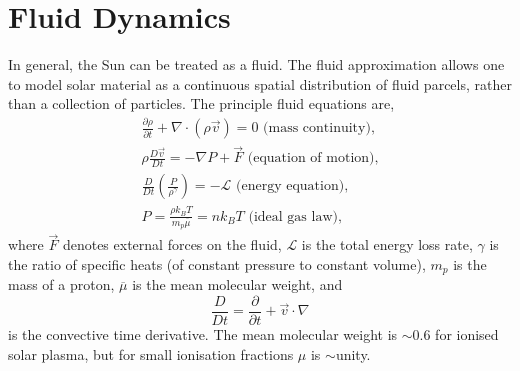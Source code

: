 \section{Fluid Dynamics}

In general, the Sun can be treated as a fluid. The fluid approximation allows one to model solar material as a continuous spatial distribution of fluid parcels, rather than a collection of particles. The principle fluid equations are,
\begin{eqnarray}
\label{eqn:mhdmasscont} \frac{\partial \rho}{\partial t}+\nabla\cdot(\rho \vec{v}) = 0 \mbox{ (mass continuity),} \\
\label{eqn:fluidmotion} \rho \frac{D \vec{v}}{D t} = -\nabla P + \vec{F} \mbox{ (equation of motion),} \\
\label{eqn:fluidenergy} \frac{D}{D t}\left( \frac{P}{\rho^{\gamma}} \right) = -\mathcal{L} \mbox{ (energy equation),} \\
P=\frac{\rho k_B T}{m_p \overline{\mu}} = n k_B T \mbox{ (ideal gas law),}
\end{eqnarray}
where $\vec{F}$ denotes external forces on the fluid, $\mathcal{L}$ is the total energy loss rate, $\gamma$ is the ratio of specific heats (of constant pressure to constant volume), $m_p$ is the mass of a proton, $\overline{\mu}$ is the mean molecular weight, and
\begin{equation}
\frac{D}{D t} = \frac{\partial}{\partial t}+\vec{v} \cdot \nabla
\end{equation}
is the convective time derivative. The mean molecular weight is $\sim$0.6 for ionised solar plasma, but for small ionisation fractions $\mu$ is $\sim$unity.

